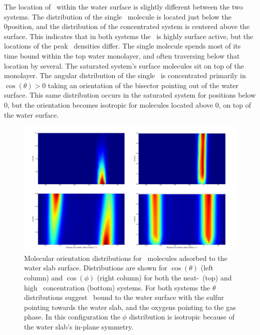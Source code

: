 The location of \suldiox~within the water surface is slightly different between the two systems. The distribution of the single \suldiox~molecule is located just below the 0\angs position, and the distribution of the concentrated system is centered above the surface. This indicates that in both systems the \suldiox~is highly surface active, but the locations of the peak \suldiox~densities differ. The single molecule spends most of its time bound within the top water monolayer, and often traversing below that location by several\angs. The saturated system's surface molecules sit on top of the monolayer. The angular distribution of the single \suldiox~is concentrated primarily in $\cos(\theta)>0$ taking an orientation of the bisector pointing out of the water surface. This same distribution occurs in the saturated system for positions below 0\angs, but the orientation becomes isotropic for molecules located above 0\angs, on top of the water surface.


\begin{figure}[h!]
	\begin{center}
		\includegraphics[scale=1.0]{images/so2orientationsmall.png}
		\caption{Molecular orientation distributions for \suldiox~molecules adsorbed to the water slab surface. Distributions are shown for $\cos(\theta)$ (left column) and $\cos(\phi)$ (right column) for both the neat-\wat~(top) and high \suldiox~concentration (bottom) systems. For both systems the $\theta$ distributions suggest \suldiox~bound to the water surface with the sulfur pointing towards the water slab, and the oxygens pointing to the gas phase. In this configuration the $\phi$ distribution is isotropic because of the water slab's in-plane symmetry.}
		\label{fig:so2-orientation}
	\end{center}
\end{figure}
